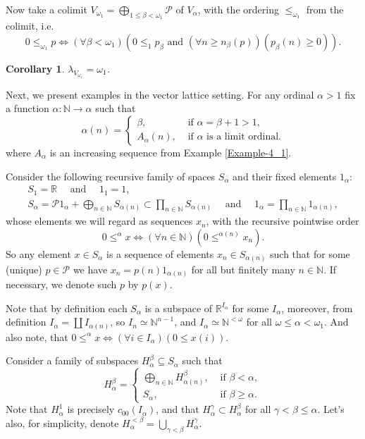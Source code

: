 \documentclass[10pt]{article}
\newtheorem{corollary}{Corollary}[section]
\renewcommand{\a}{\alpha}
\renewcommand{\b}{\beta}
\newcommand{\g}{\gamma}
\newcommand{\w}{\omega}
\begin{document}
\noindent
Now take a colimit $V_{\w_1}=\bigoplus_{1 \leqslant \b < \w_1} \mathcal{P}$ of $V_\a $, with the ordering $ \leqslant_{\w_1}$ from the colimit, i.e.
$$
   0 \leqslant_{\w_1} p \iff ( \forall \b < \w_1 ) ( 0 \leqslant_1 p_\b \text{ and } ( \forall n \geqslant n_\b(p) )( p_\b(n) \geqslant 0 ) ).
$$

\begin{corollary}\label{Corollary-4_1}
$\lambda_{V_{\w_1}} = \w_1 $.
\end{corollary}

\bigskip
Next, we present examples in the vector lattice setting. For any ordinal $ \a > 1 $ fix a function $ \a : \mathbb{N} \to \a $ such that
$$
	\a(n) =
	\begin{cases}
		\b, & \text{ if } \a = \b + 1 > 1,\\
		A_\a(n), & \text{ if } \a \text{ is a limit ordinal}.
	\end{cases}
$$
where $ A_\a $ is an increasing sequence from Example \ref{Example-4_1}.

\medskip
Consider the following recursive family of spaces $ S_\a $ and their fixed elements $ 1_\a $:
$$
\begin{gathered}
	S_1 = \mathbb R \quad\text{ and }\quad 1_1 = 1,
	\\
	S_\a = \mathcal{P}1_\alpha + \bigoplus_{n \in \mathbb N} S_{\a(n)} \subset \prod_{n \in \mathbb N} S_{\a(n)}
	\quad\text{ and }\quad
	1_\a = \prod_{n \in \mathbb N} 1_{\a(n)},
\end{gathered}
$$
whose elements we will regard as sequences $ x_n $, with the recursive pointwise order
$$
   0 \leqslant^\a x \iff (\forall n \in \mathbb N)(0 \leqslant^{\a(n)} x_n).
$$
So any element $ x \in S_\a $ is a sequence of elements $ x_n \in S_{\a(n)} $ such that for some (unique) 
$ p \in \mathcal{P}$ we have $ x_n = p(n)1_{\a(n)} $ for all but finitely many $ n \in \mathbb N $. If necessary, we denote such $ p $ by $ p(x) $.

\noindent
Note that by definition each $ S_\a $ is a subspace of $ \mathbb R^{I_\a} $ for some $ I_\a $, 
moreover, from definition $ I_\a = \coprod I_{\a(n)} $, so $ I_n \simeq \mathbb N^{n-1} $, 
and $ I_\a \simeq \mathbb N^{<\w} $ for all $ \w \leqslant \a < \w_1 $. And also note, that $ 0 \leqslant^\a x \iff (\forall i \in I_\a)(0 \leqslant x(i)) $.

\medskip
Consider a family of subspaces $ H_\a^\b \subseteq S_\a $ such that
$$
	H_\a^\b =
	\begin{cases}
		\bigoplus\limits_{n \in \mathbb N} H_{\a(n)}^\b, & \text{ if } \b < \a, \\
		S_\a, & \text{ if } \b \geqslant \a.
	\end{cases}
$$
Note that $ H_\a^1 $ is precisely $c_{00}(I_\a)$, and that $ H_\a^\g \subset H_\a^\b $ for all $ \g < \b \leqslant \a $.
Let's also, for simplicity, denote $ H_\a^{<\b} = \bigcup\limits_{\g < \b} H_\a^\g $.
\end{document}
